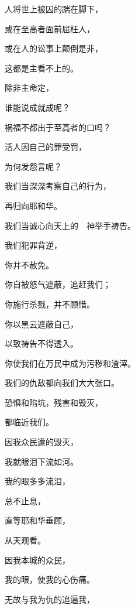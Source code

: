 {\par }{\BB \par }{\Q {}人将世上被囚的踹在脚下，
\par }{\Q {}或在至高者面前屈枉人，
\par }{\Q {}或在人的讼事上颠倒是非，
\par }{\Q 这都是主看不上的。
\par }{\BB \par }{\Q {}除非主命定，
\par }{\Q 谁能说成就成呢？
\par }{\Q {}祸福不都出于至高者的口吗？
\par }{\Q {}活人因自己的罪受罚，
\par }{\Q 为何发怨言呢？
\par }{\BB \par }{\Q {}我们当深深考察自己的行为，
\par }{\Q 再归向耶和华。
\par }{\Q {}我们当诚心向天上的　神举手祷告。
\par }{\Q {}我们犯罪背逆，
\par }{\Q 你并不赦免。
\par }{\BB \par }{\Q {}你自被怒气遮蔽，追赶我们；
\par }{\Q 你施行杀戮，并不顾惜。
\par }{\Q {}你以黑云遮蔽自己，
\par }{\Q 以致祷告不得透入。
\par }{\Q {}你使我们在万民中成为污秽和渣滓。
\par }{\BB \par }{\Q {}我们的仇敌都向我们大大张口。
\par }{\Q {}恐惧和陷坑，残害和毁灭，
\par }{\Q 都临近我们。
\par }{\Q {}因我众民遭的毁灭，
\par }{\Q 我就眼泪下流如河。
\par }{\BB \par }{\Q {}我的眼多多流泪，
\par }{\Q 总不止息，
\par }{\Q {}直等耶和华垂顾，
\par }{\Q 从天观看。
\par }{\Q {}因我本城的众民，
\par }{\Q 我的眼，使我的心伤痛。
\par }{\BB \par }{\Q {}无故与我为仇的追逼我，
}
